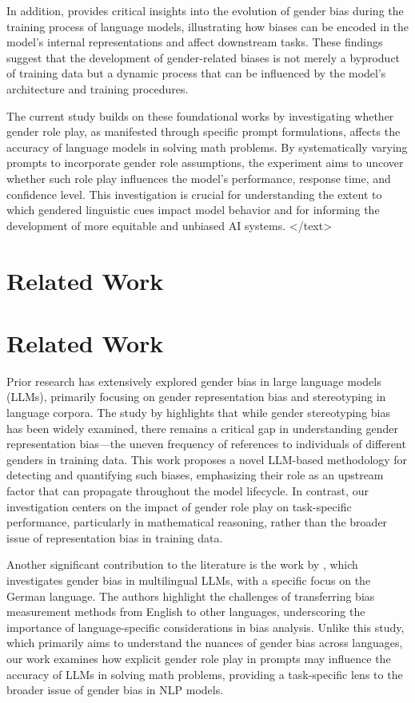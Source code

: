 \documentclass{article}
\begin{document}
In addition, \cite{2207.10245v1} provides critical insights into the evolution of gender bias during the training process of language models, illustrating how biases can be encoded in the model's internal representations and affect downstream tasks. These findings suggest that the development of gender-related biases is not merely a byproduct of training data but a dynamic process that can be influenced by the model's architecture and training procedures.

The current study builds on these foundational works by investigating whether gender role play, as manifested through specific prompt formulations, affects the accuracy of language models in solving math problems. By systematically varying prompts to incorporate gender role assumptions, the experiment aims to uncover whether such role play influences the model's performance, response time, and confidence level. This investigation is crucial for understanding the extent to which gendered linguistic cues impact model behavior and for informing the development of more equitable and unbiased AI systems.
</text>
\section{Related Work}
\section{Related Work}

Prior research has extensively explored gender bias in large language models (LLMs), primarily focusing on gender representation bias and stereotyping in language corpora. The study by \cite{2406.13677v3} highlights that while gender stereotyping bias has been widely examined, there remains a critical gap in understanding gender representation bias—the uneven frequency of references to individuals of different genders in training data. This work proposes a novel LLM-based methodology for detecting and quantifying such biases, emphasizing their role as an upstream factor that can propagate throughout the model lifecycle. In contrast, our investigation centers on the impact of gender role play on task-specific performance, particularly in mathematical reasoning, rather than the broader issue of representation bias in training data.

Another significant contribution to the literature is the work by \cite{2507.16557v1}, which investigates gender bias in multilingual LLMs, with a specific focus on the German language. The authors highlight the challenges of transferring bias measurement methods from English to other languages, underscoring the importance of language-specific considerations in bias analysis. Unlike this study, which primarily aims to understand the nuances of gender bias across languages, our work examines how explicit gender role play in prompts may influence the accuracy of LLMs in solving math problems, providing a task-specific lens to the broader issue of gender bias in NLP models.
\end{document}
